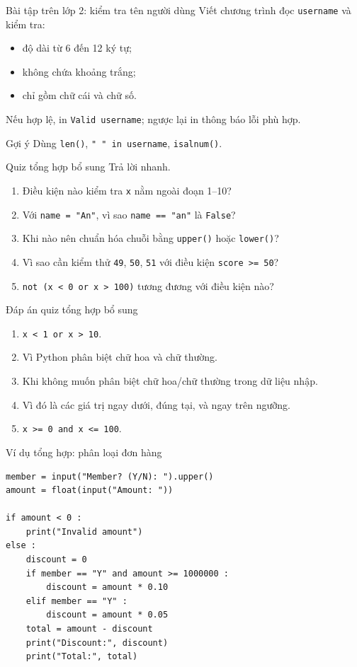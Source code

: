 \documentclass[aspectratio=169,11pt]{beamer}
\newcommand{\code}[1]{\texttt{#1}}
\newcommand{\smallgap}{\vspace{0.4em}}
\begin{document}
\begin{frame}[fragile]{Bài tập trên lớp 2: kiểm tra tên người dùng}
Viết chương trình đọc \code{username} và kiểm tra:
\begin{itemize}
  \item độ dài từ 6 đến 12 ký tự;
  \item không chứa khoảng trắng;
  \item chỉ gồm chữ cái và chữ số.
\end{itemize}
\smallgap
Nếu hợp lệ, in \code{Valid username}; ngược lại in thông báo lỗi phù hợp.
\smallgap
\begin{exampleblock}{Gợi ý}
Dùng \code{len()}, \code{" " in username}, \code{isalnum()}.
\end{exampleblock}
\end{frame}



\begin{frame}{Quiz tổng hợp bổ sung}
Trả lời nhanh.
\begin{enumerate}
  \item Điều kiện nào kiểm tra \code{x} nằm ngoài đoạn 1--10?
  \item Với \code{name = "An"}, vì sao \code{name == "an"} là \code{False}?
  \item Khi nào nên chuẩn hóa chuỗi bằng \code{upper()} hoặc \code{lower()}?
  \item Vì sao cần kiểm thử \code{49}, \code{50}, \code{51} với điều kiện \code{score >= 50}?
  \item \code{not (x < 0 or x > 100)} tương đương với điều kiện nào?
\end{enumerate}
\end{frame}

\begin{frame}{Đáp án quiz tổng hợp bổ sung}
\begin{enumerate}
  \item \code{x < 1 or x > 10}.
  \item Vì Python phân biệt chữ hoa và chữ thường.
  \item Khi không muốn phân biệt chữ hoa/chữ thường trong dữ liệu nhập.
  \item Vì đó là các giá trị ngay dưới, đúng tại, và ngay trên ngưỡng.
  \item \code{x >= 0 and x <= 100}.
\end{enumerate}
\end{frame}

\begin{frame}[fragile]{Ví dụ tổng hợp: phân loại đơn hàng}
\begin{lstlisting}[style=py]
member = input("Member? (Y/N): ").upper()
amount = float(input("Amount: "))

if amount < 0 :
    print("Invalid amount")
else :
    discount = 0
    if member == "Y" and amount >= 1000000 :
        discount = amount * 0.10
    elif member == "Y" :
        discount = amount * 0.05
    total = amount - discount
    print("Discount:", discount)
    print("Total:", total)
\end{lstlisting}
\end{frame}
\end{document}
